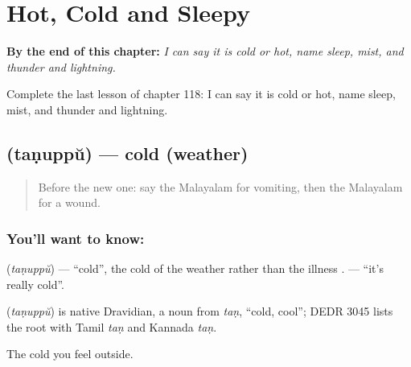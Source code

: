 
\chapter{Hot, Cold and Sleepy}
\label{ch:ml-hot-cold-sleepy}

\begin{chapteropening}
\textbf{By the end of this chapter:} \emph{I can say it is cold or hot, name sleep, mist, and thunder and lightning.}

Complete the last lesson of chapter 118: I can say it is cold or hot, name sleep, mist, and thunder and lightning.
\end{chapteropening}

\section[\texorpdfstring{\ml{തണുപ്പ്} (taṇuppŭ)}{തണുപ്പ് (taṇuppŭ)}]{ (taṇuppŭ) — cold (weather)}

\label{lesson:ML-C118-coldweather}



\begin{quote}
Before the new one: say the Malayalam for vomiting, then the Malayalam for a wound.
\end{quote}

\subsection*{You'll want to know: }
\textbf{} (\emph{taṇuppŭ}) — \textquotedblleft{}cold\textquotedblright{}, the cold of the weather rather than the illness \textbf{}. \textbf{ } — \textquotedblleft{}it's really cold\textquotedblright{}.

\begin{cousinweb}
\textbf{} (\emph{taṇuppŭ}) is native Dravidian, a noun from \emph{taṇ}, \textquotedblleft{}cold, cool\textquotedblright{}; DEDR 3045 lists the root with Tamil \emph{taṇ} and Kannada \emph{taṇ}.
\end{cousinweb}

\begin{grammarlens}[title={What you've built}]
The cold you feel outside.
\end{grammarlens}

